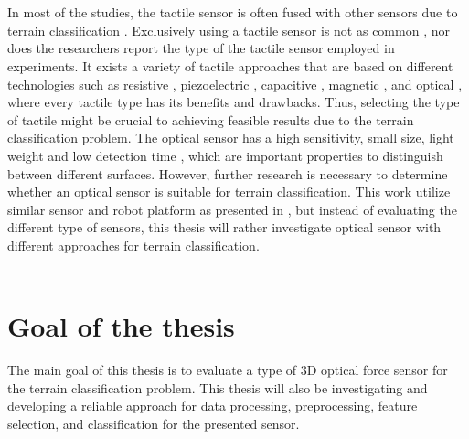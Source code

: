 \documentclass[USenglish]{ifimaster}  %
\begin{document}
\\
\\
In most of the studies, the tactile sensor is often fused with other sensors due to terrain classification \cite{5752869,6849778,Walas2015,Hoffmann20141790,7397881}. Exclusively using a tactile sensor is not as common \cite{6784609,Walas2015}, nor does the researchers report the type of the tactile sensor employed in experiments. It exists a variety of tactile approaches that are based on different technologies such as resistive \cite{928844,4276807,Wisitsoraat200717,351572}, piezoelectric  \cite{4200745,1331377}, capacitive \cite{99980,554353}, magnetic \cite{Chi2004172}, and optical \cite{220165,20431,Nicholls1990,1545264,1381228,7559098,Heo2006312}, where every tactile type has its benefits and drawbacks. Thus, selecting the type of tactile might be crucial to achieving feasible results due to the terrain classification problem. The optical sensor has a high sensitivity, small size, light weight and low detection time \cite{Dutta2016}, which are important properties to distinguish between different surfaces. However, further research is necessary to determine whether an optical sensor is suitable for terrain classification. This work utilize similar sensor and robot platform as presented in \cite{6784609}, but instead of evaluating the different type of sensors, this thesis will rather investigate optical sensor with different approaches for terrain classification.
\\
\\
\section{Goal of the thesis}
The main goal of this thesis is to evaluate a type of 3D optical force sensor for the terrain classification problem. This thesis will also be investigating and developing a reliable approach for data processing, preprocessing, feature selection, and classification for the presented sensor.
\end{document}
